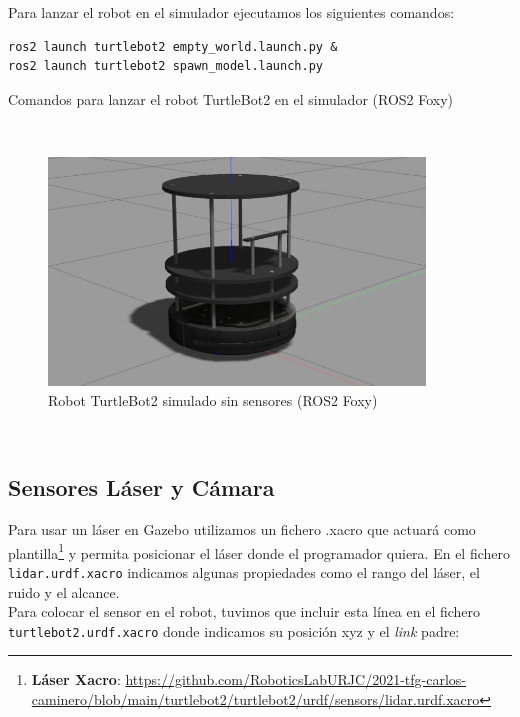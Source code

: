 Para lanzar el robot en el simulador ejecutamos los siguientes comandos:\\
\begin{code}[H]
\begin{lstlisting}
ros2 launch turtlebot2 empty_world.launch.py &
ros2 launch turtlebot2 spawn_model.launch.py
\end{lstlisting}
\caption{Comandos para lanzar el robot TurtleBot2 en el simulador (ROS2 Foxy)}
\label{codd:comandos_turtlebot2_simulador}
\end{code}\

\begin{figure} [H]
  \begin{center}
    \includegraphics[width=10cm]{imagenes/cap4/cuerpo_turtlebot2.png}
  \end{center}
  \caption[Robot TurtleBot2 simulado sin sensores (ROS2 Foxy)]{Robot TurtleBot2 simulado sin sensores (ROS2 Foxy)}
  \label{fig:turtlebot2_sin_sensores_simulado}
\end{figure}\



\subsection{Sensores Láser y Cámara}
\label{subsec:sensores_camara}

Para usar un láser en Gazebo utilizamos un fichero .xacro que actuará como plantilla\footnote{\textbf{Láser Xacro}: \url{https://github.com/RoboticsLabURJC/2021-tfg-carlos-caminero/blob/main/turtlebot2/turtlebot2/urdf/sensors/lidar.urdf.xacro}} y permita posicionar el láser donde el programador quiera. En el fichero \texttt{lidar.urdf.xacro} indicamos algunas propiedades como el rango del láser, el ruido y el alcance.\\

Para colocar el sensor en el robot, tuvimos que incluir esta línea en el fichero \texttt{turtlebot2.urdf.xacro} donde indicamos su posición xyz y el \textit{link} padre:\\

